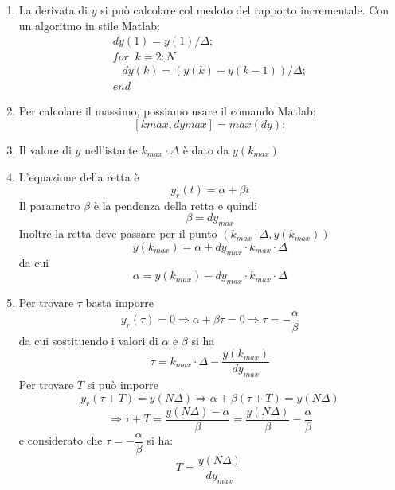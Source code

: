 \documentclass[a4paper]{report}
\begin{document}
\begin{enumerate}[label=\underline{\emph{Punto \alph*}}]
\item La derivata di $y$ si pu\`o calcolare col medoto del rapporto
  incrementale. Con un algoritmo in stile Matlab:
  \[
  \begin{array}{l}
    dy(1) = y(1)/\Delta;\\
    for\;\; k = 2 : N\\
    \;\;\; dy(k) = (y(k) - y(k-1))/\Delta;\\
    end  
  \end{array}
  \]
\item Per calcolare il massimo, possiamo usare il comando Matlab:
  \[
  [kmax, dymax] = max(dy);
  \]
\item Il valore di $y$ nell'istante $k_{max}\cdot \Delta$ \`e dato da
  $y(k_{max})$
\item L'equazione della retta \`e
  \[
  y_r(t) = \alpha + \beta t
  \]
  Il parametro $\beta$ \`e la pendenza della retta e quindi
  \[
  \beta = dy_{max}
  \]
  Inoltre la retta deve passare per il punto $(k_{max}\cdot \Delta,
  y(k_{max}))$
  \[
   y(k_{max}) = \alpha + dy_{max} \cdot k_{max} \cdot \Delta
  \]
  da cui
  \[
  \alpha  = y(k_{max}) - dy_{max} \cdot k_{max} \cdot \Delta
  \]
\item Per trovare $\tau$ basta imporre
  \[
  y_r(\tau) = 0 \Rightarrow \alpha + \beta \tau = 0 \Rightarrow \tau = -\dfrac{\alpha}{\beta}
  \]
  da cui sostituendo i valori di $\alpha$ e $\beta$ si ha
  \[
  \tau = k_{max} \cdot \Delta - \dfrac{y(k_{max})}{dy_{max}}
  \]
  Per trovare $T$ si pu\`o imporre
  \[
  y_r(\tau + T) = y(N\Delta) \Rightarrow \alpha + \beta(\tau + T) = y(N\Delta)
  \]
  \[
  \Rightarrow \tau + T = \dfrac{y(N\Delta) - \alpha}{\beta} =
  \dfrac{y(N\Delta)}{\beta} - \dfrac{\alpha}{\beta}
  \]
  e considerato che $\tau = - \dfrac{\alpha}{\beta}$ si ha:
  \[
  T = \dfrac{y(N\Delta)}{dy_{max}}
\  \]
\end{enumerate}
\end{document}
